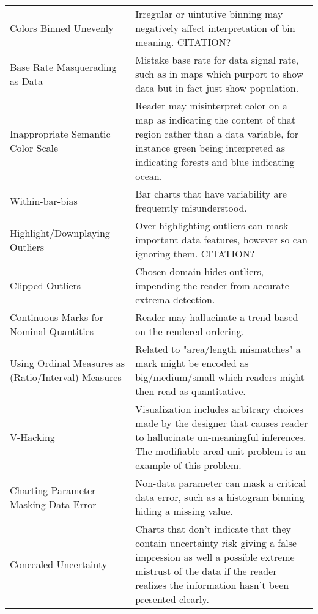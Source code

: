\begin{longtable}{p{5cm}p{12cm}}
 \rowcolor{colorc-opaque}Colors Binned Unevenly & Irregular or uintutive binning may negatively affect interpretation of bin meaning. CITATION?\\
 \rowcolor{colorc}Base Rate Masquerading as Data & Mistake base rate for data signal rate, such as in maps which purport to show data but in fact just show population. \cite{correll2016surprise}\\
 \rowcolor{colorc-opaque}Inappropriate Semantic Color Scale  & Reader may misinterpret color on a map as indicating the content of that region rather than a data variable, for instance green being interpreted as indicating forests and blue indicating ocean. \\
 \rowcolor{colorc}Within-bar-bias & Bar charts that have variability are frequently misunderstood. \cite{newman2012bar}\\
 \rowcolor{colorc-opaque}Highlight/Downplaying Outliers & Over highlighting outliers can mask important data features, however so can ignoring them. CITATION?\\
 \rowcolor{colorc}Clipped Outliers & Chosen domain hides outliers, impending the reader from accurate extrema detection. \\
 \rowcolor{colorc-opaque}Continuous Marks for Nominal Quantities & Reader may hallucinate a trend based on the rendered ordering. \cite{kindlmann2014algebraic, mcnuttlinting}\\
 \rowcolor{colorc}Using Ordinal Measures as (Ratio/Interval) Measures & Related to "area/length mismatches" a mark might be encoded as big/medium/small which readers might then read as quantitative. \cite{stevens1946theory, few2019loom}\\
 \rowcolor{colorc-opaque}V-Hacking & Visualization includes arbitrary choices made by the designer that causes reader to hallucinate un-meaningful inferences. The modifiable areal unit problem is an example of this problem. \cite{fotheringham1991modifiable, kindlmann2014algebraic}\\
 \rowcolor{colorc}Charting Parameter Masking Data Error & Non-data parameter can mask a critical data error, such as a histogram binning hiding a missing value. \cite{correll2018looks}\\
 \rowcolor{colorc-opaque}Concealed Uncertainty & Charts that don't indicate that they contain uncertainty risk giving a false impression as well a possible extreme mistrust of the data if the reader realizes the information hasn't been presented clearly.  \cite{song2018s, few2019loom, mayrTrust2019, sacha2015role}\\

\end{longtable}
